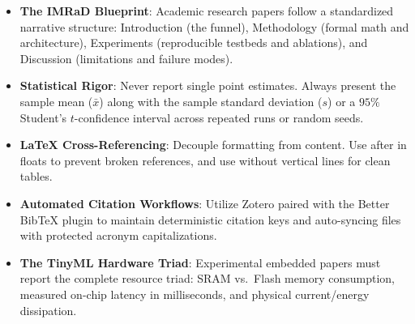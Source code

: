 \begin{takeaways}
\begin{itemize}
    \item \textbf{The IMRaD Blueprint}: Academic research papers follow a standardized narrative structure: Introduction (the funnel), Methodology (formal math and architecture), Experiments (reproducible testbeds and ablations), and Discussion (limitations and failure modes).
    \item \textbf{Statistical Rigor}: Never report single point estimates. Always present the sample mean ($\bar{x}$) along with the sample standard deviation ($s$) or a $95\%$ Student's $t$-confidence interval across repeated runs or random seeds.
    \item \textbf{\LaTeX{} Cross-Referencing}: Decouple formatting from content. Use \code{\\label} after \code{\\caption} in floats to prevent broken references, and use  without vertical lines for clean tables.
    \item \textbf{Automated Citation Workflows}: Utilize Zotero paired with the Better Bib\TeX{} plugin to maintain deterministic citation keys and auto-syncing  files with protected acronym capitalizations.
    \item \textbf{The TinyML Hardware Triad}: Experimental embedded papers must report the complete resource triad: SRAM vs.\ Flash memory consumption, measured on-chip latency in milliseconds, and physical current/energy dissipation.
\end{itemize}
\end{takeaways}

